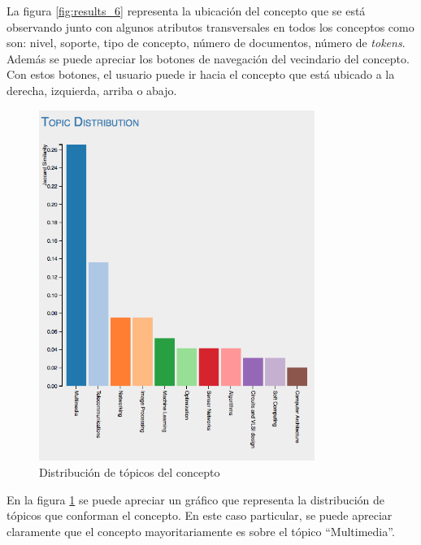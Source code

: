 \documentclass[12pt,oneside,letterpaper]{book}
\newcommand{\eng}[1]{\textit{#1}\xspace}			%
\theoremstyle{definition}
\begin{document}
La figura \ref{fig:results_6} representa la ubicación del concepto que se está observando junto con algunos atributos transversales en todos los conceptos como son: nivel, soporte, tipo de concepto, número de documentos, número de \eng{tokens}. Además se puede apreciar los botones de navegación del vecindario del concepto. Con estos botones, el usuario puede ir hacia el concepto que está ubicado a la derecha, izquierda, arriba o abajo.

 \begin{figure}[h!]
	\centering
	\includegraphics[width=0.8\textwidth]{images/results_7.png}
	\caption{Distribución de tópicos del concepto}
	\label{fig:results_7}
\end{figure}

En la figura \ref{fig:results_7} se puede apreciar un gráfico que representa la distribución de tópicos que conforman el concepto. En este caso particular, se puede apreciar claramente que el concepto mayoritariamente es sobre el tópico ``Multimedia''.
\end{document}
